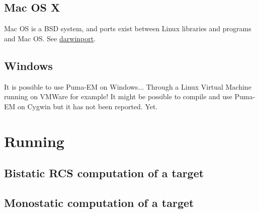 \documentclass[a4paper,10pt]{book}
\begin{document}
\section{Mac OS X}
\par
Mac OS is a BSD system, and ports exist between Linux libraries and programs and Mac OS. See \url{darwinport}.

\section{Windows}
\par
It is possible to use Puma-EM on Windows... Through a Linux Virtual Machine running on VMWare for example! It might be possible to compile and use Puma-EM on Cygwin but it has not been reported. Yet. 


\chapter{Running}

\section{Bistatic RCS computation of a target}
%
\par

\section{Monostatic computation of a target}
\end{document}
